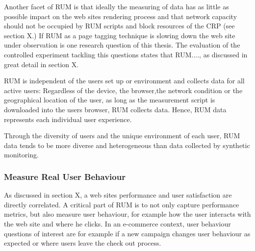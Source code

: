 Another facet of RUM is that ideally the measuring of data has as little as possible impact on the web sites rendering process and that network capacity should not be occupied by RUM scripts and block resources of the CRP (see section X.) %
If RUM as a page tagging technique is slowing down the web site under observation is one research question of this thesis.
The evaluation of the controlled experiment tackling this questions states that RUM...., as discussed in great detail in section X. %



RUM is independent of the users set up or environment and collects data for all active users:
Regardless of the device, the browser,the network condition or the geographical location of the user, as long as the measurement script is downloaded into the users browser, RUM collects data.%
Hence, RUM data represents each individual user experience. %

Through the diversity of users and the unique environment of each user,  RUM data tends to be more diverse and heterogeneous than data collected by synthetic monitoring. %



\subsubsection{Measure Real User Behaviour}



As discussed in section X, a web sites performance and user satisfaction are directly correlated.
A critical part of RUM is to not only capture performance metrics, but also measure user behaviour, for example how the user interacts with the web site and where he clicks. %
In an e-commerce context, user behaviour questions of interest are for example if a new campaign changes user behaviour as expected or where users leave the check out process. %

